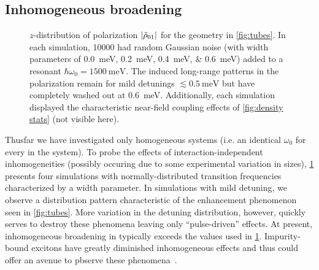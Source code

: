 \subsection{Inhomogeneous broadening}

\begin{figure}
  \centering
  
  \caption{\label{fig:broadened} 
    $z$-distribution of polarization $\abs{\tilde{\rho}_{01}}$ for the geometry in \cref{fig:tubes}.
    In each simulation, \num{10000} \qds{} had random Gaussian noise (with width parameters of \SIlist{0.0;0.2;0.4;0.6}{\milli\eV}) added to a resonant $\hbar \omega_0 = \SI{1500}{\milli\eV}$.
    The induced long-range patterns in the polarization remain for mild detunings $\lesssim \SI{0.5}{\milli\eV}$ but have completely washed out at \SI{0.6}{\milli\eV}.
    Additionally, each simulation displayed the characteristic near-field coupling effects of \cref{fig:density stats} (not visible here).
  }
\end{figure}

Thusfar we have investigated only homogeneous systems (i.e. an identical $\omega_0$ for every \qd{} in the system).
To probe the effects of interaction-independent inhomogeneities (possibly occuring due to some experimental variation in \qd{} sizes), \cref{fig:broadened} presents four simulations with normally-distributed transition frequencies characterized by a width parameter.
In simulations with mild detuning, we observe a distribution pattern characteristic of the enhancement phenomenon seen in \cref{fig:tubes}.
More variation in the detuning distribution, however, quickly serves to destroy these phenomena leaving only ``pulse-driven'' effects.
At present, inhomogeneous broadening in \qds{} typically exceeds the values used in \cref{fig:broadened}.
Impurity-bound excitons have greatly diminished inhomogeneous effects and thus could offer an avenue to pbserve these phenomena~\cite{Thewalt1977}.
